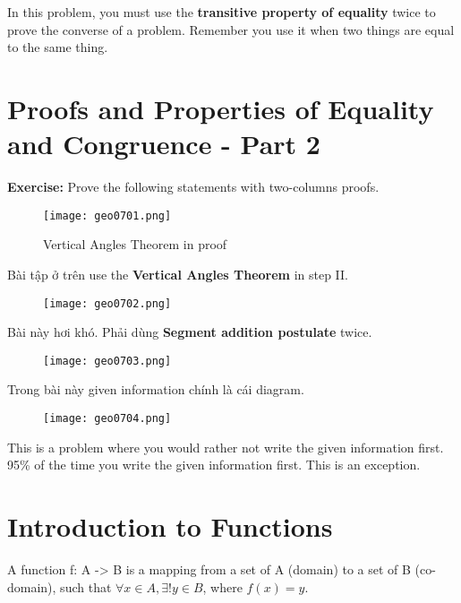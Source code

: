 In this problem, you must use the \textbf{transitive property of equality} twice to prove the converse of a problem. Remember you use it when two things are equal to the same thing.

\section{Proofs and Properties of Equality and Congruence - Part 2}

\textbf{Exercise:} Prove the following statements with two-columns proofs.

\newpage

\begin{figure}[htb!]
  \centering
  \texttt{[image: geo0701.png]}
  \caption{Vertical Angles Theorem in proof}
\end{figure}

Bài tập ở trên use the \textbf{Vertical Angles Theorem} in step II.

\begin{figure}[htb!]
  \centering
  \texttt{[image: geo0702.png]}
\end{figure}

Bài này hơi khó. Phải dùng \textbf{Segment addition postulate} twice.

\newpage

\begin{figure}[htb!]
  \centering
  \texttt{[image: geo0703.png]}
\end{figure}

Trong bài này given information chính là cái diagram.

\begin{figure}[htb!]
  \centering
  \texttt{[image: geo0704.png]}
\end{figure}

This is a problem where you would rather not write the given information first. 95\% of the time you write the given information first. This is an exception.

\section{Introduction to Functions}

A function f: A -> B is a mapping from a set of A (domain) to a set of B (co-domain), such that $\forall x\in A, \exists !y \in B$, where $f(x)=y$.

